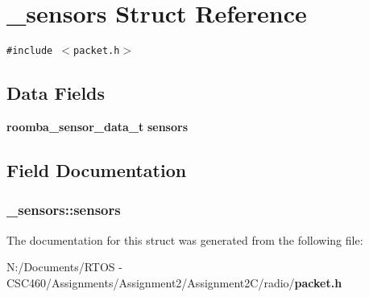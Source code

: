 \section{\_\-sensors Struct Reference}
\label{struct__sensors}
{\tt \#include $<$packet.h$>$}

\subsection*{Data Fields}
\begin{CompactItemize}
\item 
{\bf roomba\_\-sensor\_\-data\_\-t} {\bf sensors}
\end{CompactItemize}


\subsection{Field Documentation}
\subsubsection{ {\bf \_\-sensors::sensors}}\label{struct__sensors_67bd77ca1d3bc4ecb148c1ba5af8ad51}




The documentation for this struct was generated from the following file:\begin{CompactItemize}
\item 
N:/Documents/RTOS - CSC460/Assignments/Assignment2/Assignment2C/radio/{\bf packet.h}\end{CompactItemize}

